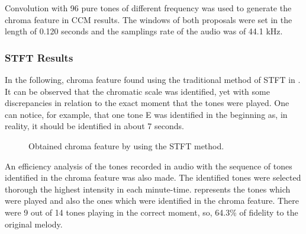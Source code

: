 \documentclass{article}
\begin{document}
	Convolution with 96 pure tones of different frequency was used to generate the chroma feature in CCM results. The windows of both proposals were set in the length of 0.120 seconds and the samplings rate of the audio was of 44.1 kHz.

	\subsubsection{STFT Results}
	In the following, chroma feature found using the traditional method of STFT in . It can be observed that the chromatic scale was identified, yet with some discrepancies in relation to the exact moment that the tones were played. One can notice, for example, that one tone E was identified in the beginning as, in reality, it should be identified in about 7 seconds. 

	
	\begin{figure}[h!]
	 \centerline{}
	 \caption{Obtained chroma feature by using the STFT method.}
	 \label{fig:1-ssft}
	\end{figure}	

	
	An efficiency analysis of the tones recorded in audio with the sequence of tones identified in the chroma feature was also made. The identified tones were selected thorough the highest intensity in each minute-time.  represents the tones which were played and also the ones which were identified in the chroma feature. There were 9 out of 14 tones playing in the correct moment, so, 64.3\% of fidelity to the original melody.  

	
\end{document}
